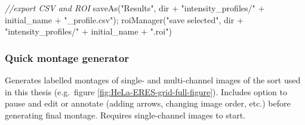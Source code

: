 \documentclass[
  12pt,
  a4paper,
]{book}
\newenvironment{Shaded}{}{}
\newcommand{\CommentTok}[1]{\textcolor[rgb]{0.38,0.63,0.69}{\textit{#1}}}
\newcommand{\NormalTok}[1]{#1}
\newcommand{\OperatorTok}[1]{\textcolor[rgb]{0.40,0.40,0.40}{#1}}
\newcommand{\StringTok}[1]{\textcolor[rgb]{0.25,0.44,0.63}{#1}}
\begin{document}
\begin{Shaded}
\begin{Highlighting}[]
\CommentTok{//export CSV and ROI}
\NormalTok{saveAs}\OperatorTok{(}\StringTok{"Results"}\OperatorTok{,}\NormalTok{ dir }\OperatorTok{+} \StringTok{"intensity\_profiles/"} \OperatorTok{+}\NormalTok{ initial\_name }\OperatorTok{+} \StringTok{"\_profile.csv"}\OperatorTok{);}
\NormalTok{roiManager}\OperatorTok{(}\StringTok{"save selected"}\OperatorTok{,}\NormalTok{ dir }\OperatorTok{+} \StringTok{"intensity\_profiles/"} \OperatorTok{+}\NormalTok{ initial\_name }\OperatorTok{+} \StringTok{".roi"}\OperatorTok{)}
\end{Highlighting}
\end{Shaded}

\subsubsection{Quick montage generator}\label{quick-montage-generator}

Generates labelled montages of single- and multi-channel images of the sort used in this thesis (e.g.~figure \ref{fig:HeLa-ERES-grid-full-figure}). Includes option to pause and edit or annotate (adding arrows, changing image order, etc.) before generating final montage. Requires single-channel images to start.
\end{document}
